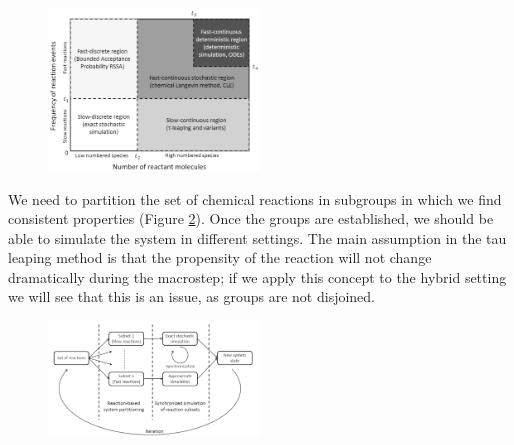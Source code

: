 \begin{figure}
  \centering
  \includegraphics[width=0.5\textwidth]{regions.png}
  \caption{}
  \label{fig:regions}
\end{figure}
\noindent
We need to partition the set of chemical reactions in subgroups in which we find consistent properties (Figure \ref{fig:scheme}).
Once the groups are established, we should be able to simulate the system in different settings.
The main assumption in the tau leaping method is that the propensity of the reaction will not change dramatically during the macrostep; if we apply this concept to the hybrid setting we will see that this is an issue, as groups are not disjoined.


\begin{figure}
  \centering
  \includegraphics[width=0.5\textwidth]{scheme.png}
  \caption{}
  \label{fig:scheme}
\end{figure}

